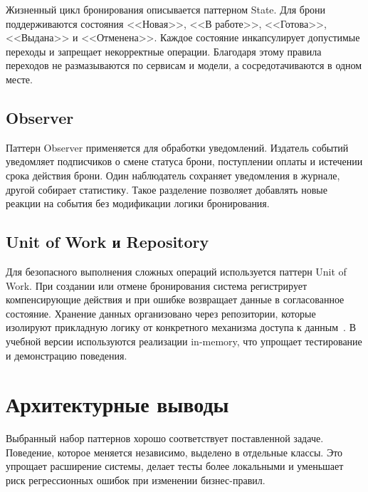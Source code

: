 Жизненный цикл бронирования описывается паттерном State. Для брони
поддерживаются состояния <<Новая>>, <<В работе>>, <<Готова>>, <<Выдана>> и
<<Отменена>>. Каждое состояние инкапсулирует допустимые переходы и запрещает
некорректные операции. Благодаря этому правила переходов не размазываются по
сервисам и модели, а сосредотачиваются в одном месте.

\subsection{Observer}

Паттерн Observer применяется для обработки уведомлений. Издатель событий
уведомляет подписчиков о смене статуса брони, поступлении оплаты и истечении
срока действия брони. Один наблюдатель сохраняет уведомления в журнале, другой
собирает статистику. Такое разделение позволяет добавлять новые реакции на
события без модификации логики бронирования.

\subsection{Unit of Work и Repository}

Для безопасного выполнения сложных операций используется паттерн Unit of Work.
При создании или отмене бронирования система регистрирует компенсирующие
действия и при ошибке возвращает данные в согласованное состояние. Хранение
данных организовано через репозитории, которые изолируют прикладную логику от
конкретного механизма доступа к данным~\cite{fowler2002}. В учебной версии
используются реализации in-memory, что упрощает тестирование и демонстрацию
поведения.

\section{Архитектурные выводы}

Выбранный набор паттернов хорошо соответствует поставленной задаче. Поведение,
которое меняется независимо, выделено в отдельные классы. Это упрощает
расширение системы, делает тесты более локальными и уменьшает риск
регрессионных ошибок при изменении бизнес-правил.
